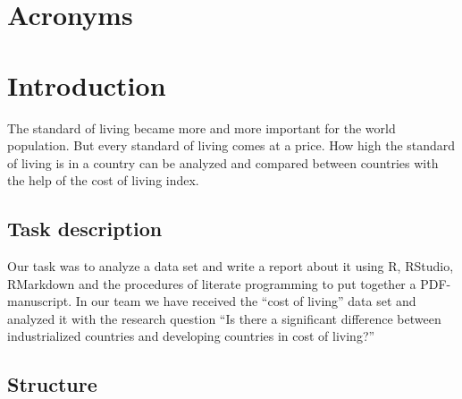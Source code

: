 \documentclass[
  11pt,
  a4paper,
  twoside]{scrbook}
\begin{document}
{
\setcounter{tocdepth}{3}

{}

\tableofcontents
\newpage
}


\renewcommand{\cftfignumwidth}{6em}
\renewcommand{\cftfigpresnum}{Fig. }
{}
\listoffigures
\renewcommand{\cfttabnumwidth}{6em}
\renewcommand{\cfttabpresnum}{Tbl. }
{}
\listoftables
\newpage

\chapter*{Acronyms}
\begin{acronym}[XXXXX]

\end{acronym}
\clearpage


\setcounter{page}{1}

\doublespacing

\hypertarget{introduction}{%
\chapter{Introduction}\label{introduction}}

The standard of living became more and more important for the world population. But every standard of living comes at a price. How high the standard of living is in a country can be analyzed and compared between countries with the help of the cost of living index.

\hypertarget{task-description}{%
\section{Task description}\label{task-description}}

Our task was to analyze a data set and write a report about it using R, RStudio, RMarkdown and the procedures of literate programming to put together a PDF-manuscript.
In our team we have received the ``cost of living'' data set and analyzed it with the research question ``Is there a significant difference between industrialized countries and developing countries in cost of living?''

\hypertarget{structure}{%
\section{Structure}\label{structure}}
\end{document}
